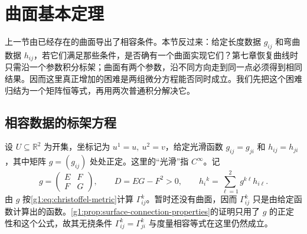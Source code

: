 
% 
% 
% 
% 
% 
% 
% 
% 
% 
% 
% 
% 
% 
% 
% 

\section{曲面基本定理}
\label{g1:sec:0804}

上一节由已经存在的曲面导出了相容条件。本节反过来：给定长度数据 \(g_{ij}\) 和弯曲数据 \(h_{ij}\)，若它们满足那些条件，是否确有一个曲面实现它们？第七章恢复曲线时只需沿一个参数积分标架；曲面有两个参数，沿不同方向走到同一点必须得到相同结果。因而这里真正增加的困难是两组微分方程能否同时成立。我们先把这个困难归结为一个矩阵恒等式，再用两次普通积分解决它。

\subsection{相容数据的标架方程}
\label{g1:subsec:0804:01}

设 \(U\subseteq\mathbb R^2\) 为开集，坐标记为 \(u^1=u,\ u^2=v\)，给定光滑函数 \(g_{ij}=g_{ji}\) 和 \(h_{ij}=h_{ji}\)，其中矩阵 \(g=(g_{ij})\) 处处正定。这里的“光滑”指 \(C^\infty\)。记
\[
	g=\begin{pmatrix}E&F\\F&G\end{pmatrix},\qquad D=EG-F^2>0,
	\qquad h_i{}^k=\sum_{\ell=1}^2g^{k\ell}h_{i\ell}.
\]
由 \(g\) 按\eqref{g1:eq:christoffel-metric}计算 \(\Gamma^k_{ij}\)。暂时还没有曲面，因而 \(\Gamma^k_{ij}\) 只是由给定函数计算出的函数。\cref{g1:prop:surface-connection-properties}的证明只用了 \(g\) 的正定性和这个公式，故其无挠条件 \(\Gamma^k_{ij}=\Gamma^k_{ji}\) 与度量相容等式在这里仍然成立。

\ProseParagraphBreak

